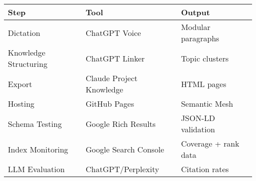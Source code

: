 \begin{center}
\begin{tabular}{|l|l|l|}
\hline
\textbf{Step} & \textbf{Tool} & \textbf{Output} \\
\hline
Dictation & ChatGPT Voice & Modular paragraphs \\
Knowledge Structuring & ChatGPT Linker & Topic clusters \\
Export & Claude Project Knowledge & HTML pages \\
Hosting & GitHub Pages & Semantic Mesh \\
Schema Testing & Google Rich Results & JSON-LD validation \\
Index Monitoring & Google Search Console & Coverage + rank data \\
LLM Evaluation & ChatGPT/Perplexity & Citation rates \\
\hline
\end{tabular}
\end{center}

